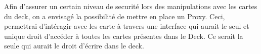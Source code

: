 Afin d'assurer un certain niveau de securité lors des manipulations avec les cartes du deck, on a envisagé la possibilité de mettre en place un Proxy.
Ceci, permettrai d'intéragir avec les carte à travers une interface qui aurait le seul et unique droit d'accéder à toutes les cartes présentes dans le Deck.
Ce serait la seule qui aurait le droit d'écrire dans le deck.
